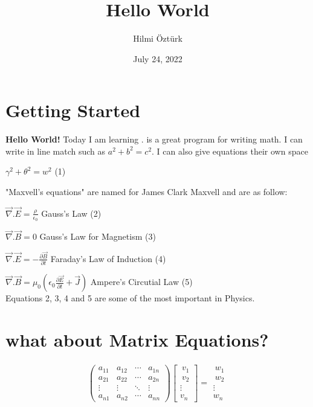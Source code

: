 \documentclass{article}
\title{Hello World}
\author{Hilmi Öztürk}
\date{July 24, 2022}
\begin{document}
\maketitle

\section{Getting Started}
\textbf{Hello World!} Today I am learning  .  is a great program for writing math. I can write in
line match such as \(a^2 + b^2 = c^2\). I can also give equations their own space

\hfill\(    \gamma^2 +  \theta^2 = w^2\)    \hfill      (1)

"Maxvell's equations" are named for James Clark Maxvell and are as follow:

$\vec{\nabla}.\vec{E}=\frac{\rho}{\epsilon_0}$   \hfill          Gauss's Law     (2)

$\vec{\nabla}.\vec{B}=0$ \hfill     Gauss's Law for Magnetism  (3)

$\vec{\nabla}.\vec{E}= -\frac{\partial\vec{B}}{\partial{t}}$     \hfill      Faraday's Law of Induction     (4)

$\vec{\nabla}.\vec{B}=\mu_0(\epsilon_0\frac{\partial\vec{E}}{\partial{t}}+\vec{J})$   \hfill  Ampere's Circutial Law    (5)     \\

Equations {\color{blue}2, 3, 4} and {\color{blue}5} are some of the most important in Physics.

\section{what about Matrix Equations?}
\begin{gather*}
\begin{pmatrix}
    a_{11} & a_{12} & \cdots & a_{1n} \\    %
    a_{21} & a_{22} & \cdots & a_{2n} \\    %
    \vdots & \vdots & \ddots & \vdots \\    %
    a_{n1} & a_{n2} & \cdots & a_{nn} 
\end{pmatrix}
\begin{bmatrix}
    \ v_{1} \\[0.3em]
    \ v_{2} \\[0.3em]
    \vdots \\[0.3em]
    v_{n}
\end{bmatrix} = 
\begin{matrix}
    \ w_{1} \\[0.38em]
    \ w_{2} \\[0.3em]
    \vdots \\[0.3em]
w_{n}
\end{matrix}
\end{gather*}
\end{document}
